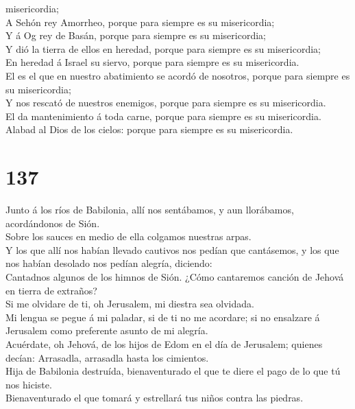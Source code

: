 misericordia;\\
 A Sehón rey Amorrheo, porque para siempre es su
misericordia;\\
 Y á Og rey de Basán, porque para siempre es su
misericordia;\\
 Y dió la tierra de ellos en heredad, porque para siempre
es su misericordia;\\
 En heredad á Israel su siervo, porque para siempre es su
misericordia.\\
 El es el que en nuestro abatimiento se acordó de nosotros,
porque para siempre es su misericordia;\\
 Y nos rescató de nuestros enemigos, porque para siempre es
su misericordia.\\
 El da mantenimiento á toda carne, porque para siempre es
su misericordia.\\
 Alabad al Dios de los cielos: porque para siempre es su
misericordia.

\hypertarget{section-136}{%
\section{137}\label{section-136}}

 Junto á los ríos de Babilonia, allí nos sentábamos, y aun
llorábamos, acordándonos de Sión.\\
 Sobre los sauces en medio de ella colgamos nuestras
arpas.\\
 Y los que allí nos habían llevado cautivos nos pedían que
cantásemos, y los que nos habían desolado nos pedían alegría,
diciendo:\\
 Cantadnos algunos de los himnos de Sión. ¿Cómo cantaremos
canción de Jehová en tierra de extraños?\\
 Si me olvidare de ti, oh Jerusalem, mi diestra sea
olvidada.\\
 Mi lengua se pegue á mi paladar, si de ti no me acordare;
si no ensalzare á Jerusalem como preferente asunto de mi alegría.\\
 Acuérdate, oh Jehová, de los hijos de Edom en el día de
Jerusalem; quienes decían: Arrasadla, arrasadla hasta los cimientos.\\
 Hija de Babilonia destruída, bienaventurado el que te diere
el pago de lo que tú nos hiciste.\\
 Bienaventurado el que tomará y estrellará tus niños contra
las piedras.

